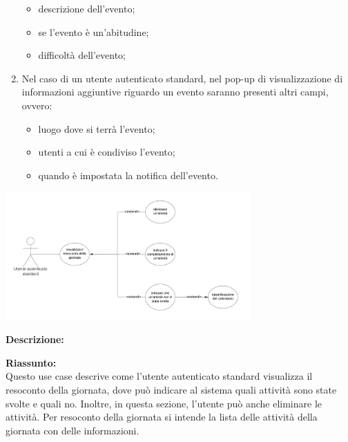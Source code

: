 \begin{listaPersonale}[UC]{}
\begin{enumerate}
\begin{itemize}
                  \item descrizione dell'evento;
                  \item se l'evento è un'abitudine;
                  \item difficoltà dell'evento;
              \end{itemize}
        \item Nel caso di un utente autenticato standard, nel pop-up di visualizzazione di informazioni aggiuntive riguardo un evento saranno presenti altri campi, ovvero:
              \begin{itemize}
                  \item luogo dove si terrà l'evento;
                  \item utenti a cui è condiviso l'evento;
                  \item quando è impostata la notifica dell'evento.
              \end{itemize}
    \end{enumerate}





    \newpage


    \begin{center}
        \includegraphics[width=0.7\textwidth]{img/Diagrammi/UseCases/ResocontoGiornata.png}
    \end{center}

    \textbf{Descrizione:}

    \textbf{Riassunto:} \\
    Questo use case descrive come l'utente autenticato standard visualizza il resoconto della giornata, dove può indicare al sistema quali attività sono state svolte e quali no. Inoltre, in questa sezione, l'utente può anche eliminare le attività. Per resoconto della giornata si intende la lista delle attività della giornata con delle informazioni.


\end{listaPersonale}
